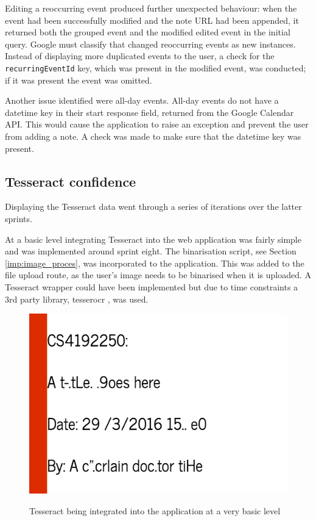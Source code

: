 {{{{{{{Editing a reoccurring event produced further unexpected behaviour: when the event had been successfully modified and the note URL had been appended, it returned both the grouped event and the modified edited event in the initial query. Google must classify that changed reoccurring events as new instances. Instead of displaying more duplicated events to the user, a check for the \texttt{recurringEventId} key, which was present in the modified event, was conducted; if it was present the event was omitted.

Another issue identified were all-day events. All-day events do not have a datetime key in their start response field, returned from the Google Calendar API. This would cause the application to raise an exception and prevent the user from adding a note. A check was made to make sure that the datetime key was present.

\subsection{Tesseract confidence}
Displaying the Tesseract data went through a series of iterations over the latter sprints.

At a basic level integrating Tesseract into the web application was fairly simple and was implemented around sprint eight. The binarisation script, see Section \ref{imp:image_proces}, was incorporated to the application. This was added to the file upload route, as the user's image needs to be binarised when it is uploaded. A Tesseract wrapper could have been implemented but due to time constraints a 3rd party library, tesserocr \cite{citeulike:14021437}, was used.

\begin{figure}[H]
  \centering
  \includegraphics[scale=0.7]{images/tesseract_first}
  \label{fig:tesseract_output}
  \caption{Tesseract being integrated into the application at a very basic level}
\end{figure}

}}}}}}}
